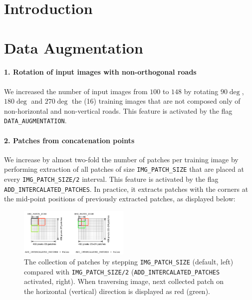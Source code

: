 \documentclass[fleqn,9 pt]{SelfArx} %
\affiliation{\textbf{Email (SCIPER):} \hspace{0.2cm} \textsuperscript{1} bruno.magalhaes@epfl.ch (212079) \hspace{0.2cm} \textsuperscript{2} riccardo.silini@epfl.ch (214398) \hspace{0.2cm}}
\begin{document}
\begin{sloppypar} %

\flushbottom %
\maketitle %

\section{Introduction}


\section{Data Augmentation}
\label{sec-pre-proc}

\paragraph{1. Rotation of input images with non-orthogonal roads} We increased the number of input images from $100$ to $148$ by rotating $90 \deg$, $180 \deg$ and $270 \deg$ the (16) training images that are not composed only of non-horizontal and non-vertical roads. This feature is activated by the flag \texttt{DATA\_AUGMENTATION}.

\paragraph{2. Patches from concatenation points} We increase by almost two-fold the number of patches per training image by performing extraction of all patches of size \texttt{IMG\_PATCH\_SIZE} that are placed at every \texttt{IMG\_PATCH\_SIZE/2} interval. This feature is activated by the flag \texttt{ADD\_INTERCALATED\_PATCHES}. In practice, it extracts patches with the corners at the mid-point positions of previously extracted patches, as displayed below:

\begin{figure}[H]
\centering
\includegraphics[width=0.47\textwidth]{figures/ADD_INTERCALATED_PATCHES.pdf}
\caption{\small The collection of patches by stepping \texttt{IMG\_PATCH\_SIZE} (default, left) compared with \texttt{IMG\_PATCH\_SIZE/2} (\texttt{ADD\_INTERCALATED\_PATCHES} activated, right). When traversing image, next collected patch on the horizontal (vertical) direction is displayed as red (green).}
\end{figure}


\end{sloppypar}
\end{document}
